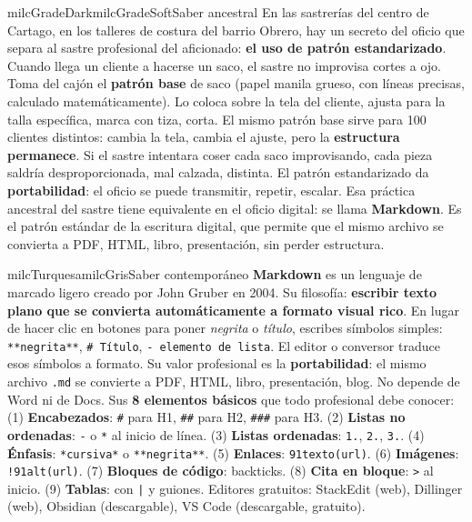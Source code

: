 \documentclass[11pt,letterpaper]{article}
\begin{document}
\begin{softbox}{milcGradeDark}{milcGradeSoft}{Saber ancestral}
En las sastrerías del centro de Cartago, en los talleres de costura del barrio Obrero, hay un secreto del oficio que separa al sastre profesional del aficionado: \textbf{el uso de patrón estandarizado}. Cuando llega un cliente a hacerse un saco, el sastre no improvisa cortes a ojo. Toma del cajón el \textbf{patrón base} de saco (papel manila grueso, con líneas precisas, calculado matemáticamente). Lo coloca sobre la tela del cliente, ajusta para la talla específica, marca con tiza, corta. El mismo patrón base sirve para 100 clientes distintos: cambia la tela, cambia el ajuste, pero la \textbf{estructura permanece}. Si el sastre intentara coser cada saco improvisando, cada pieza saldría desproporcionada, mal calzada, distinta. El patrón estandarizado da \textbf{portabilidad}: el oficio se puede transmitir, repetir, escalar. Esa práctica ancestral del sastre tiene equivalente en el oficio digital: se llama \textbf{Markdown}. Es el patrón estándar de la escritura digital, que permite que el mismo archivo se convierta a PDF, HTML, libro, presentación, sin perder estructura.
\end{softbox}

\begin{softbox}{milcTurquesa}{milcGris}{Saber contemporáneo}
\textbf{Markdown} es un lenguaje de marcado ligero creado por John Gruber en 2004. Su filosofía: \textbf{escribir texto plano que se convierta automáticamente a formato visual rico}. En lugar de hacer clic en botones para poner \emph{negrita} o \emph{título}, escribes símbolos simples: \texttt{**negrita**}, \texttt{\# Título}, \texttt{- elemento de lista}. El editor o conversor traduce esos símbolos a formato. Su valor profesional es la \textbf{portabilidad}: el mismo archivo \texttt{.md} se convierte a PDF, HTML, libro, presentación, blog. No depende de Word ni de Docs. Sus \textbf{8 elementos básicos} que todo profesional debe conocer: (1) \textbf{Encabezados}: \texttt{\#} para H1, \texttt{\#\#} para H2, \texttt{\#\#\#} para H3. (2) \textbf{Listas no ordenadas}: \texttt{-} o \texttt{*} al inicio de línea. (3) \textbf{Listas ordenadas}: \texttt{1.}, \texttt{2.}, \texttt{3.}. (4) \textbf{Énfasis}: \texttt{*cursiva*} o \texttt{**negrita**}. (5) \textbf{Enlaces}: \texttt{\char91texto(url)}. (6) \textbf{Imágenes}: \texttt{!\char91alt(url)}. (7) \textbf{Bloques de código}: backticks. (8) \textbf{Cita en bloque}: \texttt{>} al inicio. (9) \textbf{Tablas}: con \texttt{|} y guiones. Editores gratuitos: StackEdit (web), Dillinger (web), Obsidian (descargable), VS Code (descargable, gratuito).
\end{softbox}
\end{document}

